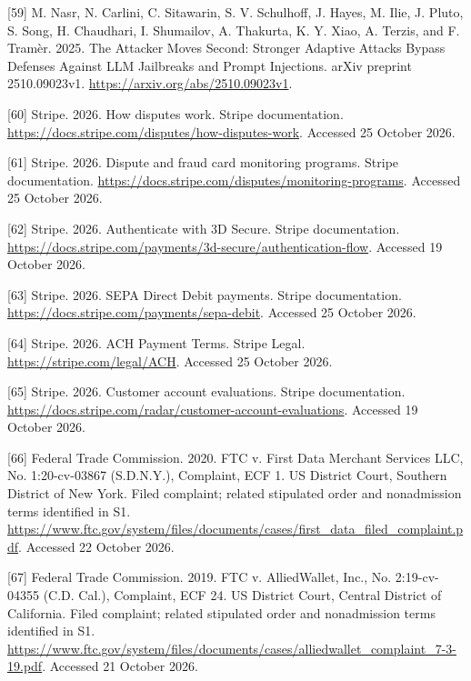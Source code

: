 \documentclass[
  11pt,
]{article}
\newlength{\cslhangindent}
\newlength{\cslentryspacingunit} %
\newenvironment{CSLReferences}[2] %
 {%
  \setlength{\parindent}{0pt}
  \ifodd #1
  \let\oldpar\par
  \def\par{\hangindent=\cslhangindent\oldpar}
  \fi
  \setlength{\parskip}{#2\cslentryspacingunit}
 }%
 {}
\begin{document}
\begin{CSLReferences}{1}{1}
\leavevmode{}%
{[}59{]} M. Nasr, N. Carlini, C. Sitawarin, S. V. Schulhoff, J. Hayes,
M. Ilie, J. Pluto, S. Song, H. Chaudhari, I. Shumailov, A. Thakurta, K.
Y. Xiao, A. Terzis, and F. Tramèr. 2025. The Attacker Moves Second:
Stronger Adaptive Attacks Bypass Defenses Against LLM Jailbreaks and
Prompt Injections. arXiv preprint 2510.09023v1.
\url{https://arxiv.org/abs/2510.09023v1}.

\leavevmode{}%
{[}60{]} Stripe. 2026. How disputes work. Stripe documentation.
\url{https://docs.stripe.com/disputes/how-disputes-work}. Accessed 25
October 2026.

\leavevmode{}%
{[}61{]} Stripe. 2026. Dispute and fraud card monitoring programs.
Stripe documentation.
\url{https://docs.stripe.com/disputes/monitoring-programs}. Accessed 25
October 2026.

\leavevmode{}%
{[}62{]} Stripe. 2026. Authenticate with 3D Secure. Stripe
documentation.
\url{https://docs.stripe.com/payments/3d-secure/authentication-flow}.
Accessed 19 October 2026.

\leavevmode{}%
{[}63{]} Stripe. 2026. SEPA Direct Debit payments. Stripe documentation.
\url{https://docs.stripe.com/payments/sepa-debit}. Accessed 25 October
2026.

\leavevmode{}%
{[}64{]} Stripe. 2026. ACH Payment Terms. Stripe Legal.
\url{https://stripe.com/legal/ACH}. Accessed 25 October 2026.

\leavevmode{}%
{[}65{]} Stripe. 2026. Customer account evaluations. Stripe
documentation.
\url{https://docs.stripe.com/radar/customer-account-evaluations}.
Accessed 19 October 2026.

\leavevmode{}%
{[}66{]} Federal Trade Commission. 2020. FTC v. First Data Merchant
Services LLC, No. 1:20-cv-03867 (S.D.N.Y.), Complaint, ECF 1. US
District Court, Southern District of New York. Filed complaint; related
stipulated order and nonadmission terms identified in S1.
\url{https://www.ftc.gov/system/files/documents/cases/first_data_filed_complaint.pdf}.
Accessed 22 October 2026.

\leavevmode{}%
{[}67{]} Federal Trade Commission. 2019. FTC v. AlliedWallet, Inc., No.
2:19-cv-04355 (C.D. Cal.), Complaint, ECF 24. US District Court, Central
District of California. Filed complaint; related stipulated order and
nonadmission terms identified in S1.
\url{https://www.ftc.gov/system/files/documents/cases/alliedwallet_complaint_7-3-19.pdf}.
Accessed 21 October 2026.


\end{CSLReferences}
\end{document}
